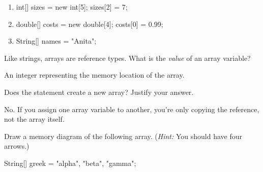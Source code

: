 \begin{minipage}{0.46\linewidth}

\begin{enumerate}

\item
\begin{javalst}
int[] sizes = new int[5];
sizes[2] = 7;
\end{javalst}

\item
\begin{javalst}
double[] costs = new double[4];
costs[0] = 0.99;
\end{javalst}

\item
\begin{javalst}
String[] names = {"Anita"};
\end{javalst}

\end{enumerate}

\end{minipage}
\hfill
\begin{minipage}{0.53\linewidth}
\end{minipage}


\Q Like strings, arrays are reference types. What is the {\it value} of an array variable?

\begin{answer}[3em]
An integer representing the memory location of the array.
\end{answer}


\Q Does the statement  create a new array? Justify your answer.

\begin{answer}[3em]
No. If you assign one array variable to another, you're only copying the reference, not the array itself.
\end{answer}


\Q Draw a memory diagram of the following array.
(\textit{Hint:} You should have four arrows.)

\begin{javalst}
String[] greek = {"alpha", "beta", "gamma"};
\end{javalst}

\vspace{1em}
\hspace{2em}

